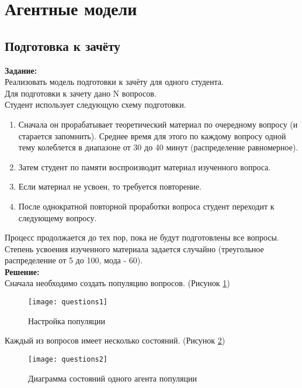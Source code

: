 \section*{Агентные модели}
\subsection*{Подготовка к зачёту}

\textbf{Задание:}\\
Реализовать модель подготовки к зачёту для одного студента.\\
Для подготовки к зачету дано N вопросов.\\
Студент использует следующую схему подготовки.\\
\begin{enumerate}[topsep=0pt,itemsep=-1ex,partopsep=1ex,parsep=1ex]
	\item Сначала он прорабатывает теоретический материал по очередному вопросу (и старается запомнить). Среднее время для этого по каждому вопросу одной тему колеблется в диапазоне от 30 до 40 минут (распределение равномерное).
	\item Затем студент по памяти воспроизводит материал изученного вопроса.
	\item Если материал не усвоен, то требуется повторение.
	\item После однократной повторной проработки вопроса студент переходит к следующему вопросу.
\end{enumerate}
Процесс продолжается до тех пор, пока не будут подготовлены все вопросы.\\
Степень усвоения изученного материала задается случайно (треугольное распределение от 5 до 100, мода - 60).\\

\textbf{Решение:}\\
Сначала необходимо создать популяцию вопросов. (Рисунок \ref{fig:questions1})
\begin{figure}[h]
	\centering \texttt{[image: questions1]}
	\caption{Настройка популяции}
	\label{fig:questions1}
\end{figure}

\newpage

Каждый из вопросов имеет несколько состояний. (Рисунок \ref{fig:questions2})
\begin{figure}[h]
	\centering \texttt{[image: questions2]}
	\caption{Диаграмма состояний одного агента популяции}
	\label{fig:questions2}
\end{figure}

